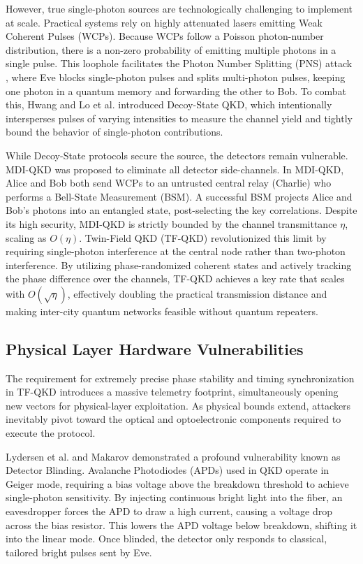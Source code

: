\documentclass[10pt, journal, letterpaper, twocolumn]{IEEEtran}
\begin{document}
However, true single-photon sources are technologically challenging to implement at scale. Practical systems rely on highly attenuated lasers emitting Weak Coherent Pulses (WCPs). Because WCPs follow a Poisson photon-number distribution, there is a non-zero probability of emitting multiple photons in a single pulse. This loophole facilitates the Photon Number Splitting (PNS) attack \cite{pns}, where Eve blocks single-photon pulses and splits multi-photon pulses, keeping one photon in a quantum memory and forwarding the other to Bob. To combat this, Hwang \cite{hwang} and Lo et al. \cite{lo2005} introduced Decoy-State QKD, which intentionally intersperses pulses of varying intensities to measure the channel yield and tightly bound the behavior of single-photon contributions.

While Decoy-State protocols secure the source, the detectors remain vulnerable. MDI-QKD \cite{mdi} was proposed to eliminate all detector side-channels. In MDI-QKD, Alice and Bob both send WCPs to an untrusted central relay (Charlie) who performs a Bell-State Measurement (BSM). A successful BSM projects Alice and Bob's photons into an entangled state, post-selecting the key correlations. Despite its high security, MDI-QKD is strictly bounded by the channel transmittance $\eta$, scaling as $O(\eta)$. Twin-Field QKD (TF-QKD) \cite{tfqkd} revolutionized this limit by requiring single-photon interference at the central node rather than two-photon interference. By utilizing phase-randomized coherent states and actively tracking the phase difference over the channels, TF-QKD achieves a key rate that scales with $O(\sqrt{\eta})$, effectively doubling the practical transmission distance and making inter-city quantum networks feasible without quantum repeaters.

\subsection{Physical Layer Hardware Vulnerabilities}
The requirement for extremely precise phase stability and timing synchronization in TF-QKD introduces a massive telemetry footprint, simultaneously opening new vectors for physical-layer exploitation. As physical bounds extend, attackers inevitably pivot toward the optical and optoelectronic components required to execute the protocol.

Lydersen et al. \cite{lydersen} and Makarov \cite{makarov} demonstrated a profound vulnerability known as Detector Blinding. Avalanche Photodiodes (APDs) used in QKD operate in Geiger mode, requiring a bias voltage above the breakdown threshold to achieve single-photon sensitivity. By injecting continuous bright light into the fiber, an eavesdropper forces the APD to draw a high current, causing a voltage drop across the bias resistor. This lowers the APD voltage below breakdown, shifting it into the linear mode. Once blinded, the detector only responds to classical, tailored bright pulses sent by Eve.
\end{document}
